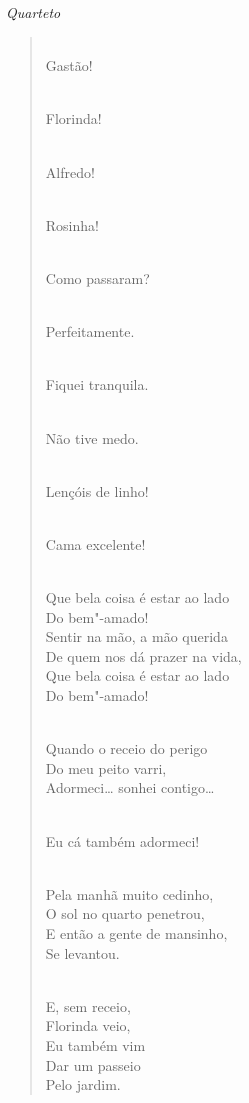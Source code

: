 {\smallskip\raggedleft\itshape Quarteto\par}
\begin{verse}
\\
Gastão!

\\
Florinda!

\\
Alfredo!

\\
Rosinha!

\\
Como passaram?

\\
Perfeitamente.

\\
Fiquei tranquila.

\\
Não tive medo.

\pagebreak

\\
Lençóis de linho!

\\
Cama excelente!

\\
Que bela coisa é estar ao lado\\
Do bem"-amado!\\
Sentir na mão, a mão querida\\
De quem nos dá prazer na vida,\\
Que bela coisa é estar ao lado\\
Do bem"-amado!

\\
Quando o receio do perigo\\
Do meu peito varri,\\
Adormeci\ldots{} sonhei contigo\ldots{}

\\
Eu cá também adormeci!

\\
Pela manhã muito cedinho,\\
O sol no quarto penetrou,\\
E então a gente de mansinho,\\
Se levantou.

\pagebreak

\\
E, sem receio,\\
Florinda veio,\\
Eu também vim\\
Dar um passeio\\
Pelo jardim.


\end{verse}
